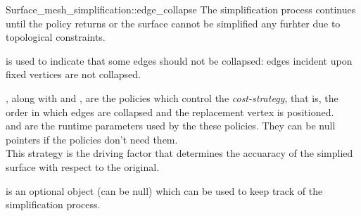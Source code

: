 \begin{ccRefFunction}{Surface_mesh_simplification::edge_collapse}
The simplification process continues until the  policy returns 
or the surface cannot be simplified any furhter due to topological constraints.

 is used to indicate that some edges should not be
collapsed: edges incident upon fixed vertices are not collapsed.

, along with  and ,
are the policies which control the {\em cost-strategy}, that is, 
the order in which edges are collapsed and the replacement vertex is positioned.\\
 and  are the runtime 
parameters used by the these policies. They can be null pointers
if the policies don't need them.\\
This strategy is the driving factor that determines the accuaracy of the
simplied surface with respect to the original.

 is an optional object (can be null) which can be used
to keep track of the simplification process.

\end{ccRefFunction}




